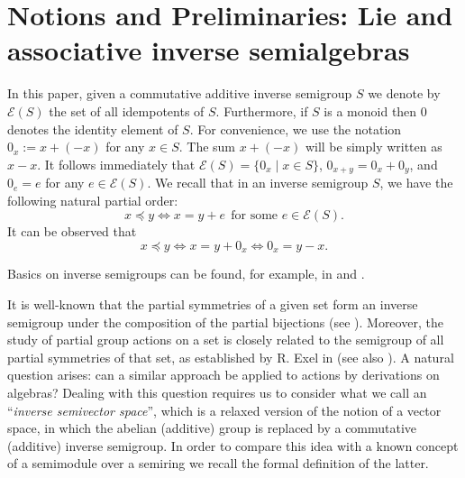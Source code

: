 \documentclass{amsart}
\newcommand{\E}{\mathcal{E}}
\newcommand{\0}{{\vartheta}}
\theoremstyle{definition}
\theoremstyle{remark}
\numberwithin{equation}{section}
\newtheorem*{Theorem A}{\textbf{Theorem A}}
\newtheorem*{Corollary E}{\textbf{Corollary E}}
\newtheorem*{Corollary F}{\textbf{Corollary F}}
\newtheorem*{Theorem B}{\textbf{Theorem B}}
\newtheorem*{Theorem C}{\textbf{Theorem C}}
\newtheorem*{Theorem D}{\textbf{Theorem B}}
\newtheorem*{p a}{\textbf{Proof of  Theorem A}}
\newtheorem*{p b}{\textbf{Proof of Theorem B}}
\newtheorem*{p c}{\textbf{Proof of  Theorem C}}
\newtheorem*{p d}{\textbf{Proof of  Theorem D}}
\begin{document}
\section{Notions and Preliminaries: Lie and associative inverse semialgebras}\label{s: preliminaries}

In this paper, given  a commutative additive inverse semigroup $S$ we denote by $\E(S)$ the set of all idempotents of $S$. Furthermore, if $S$ is a monoid then $0$ denotes the identity element of $S$. For convenience, we use the notation  $0_x:=x +(-x)$ for any $x\in S.$ The sum $
x +(-x)$ will be simply written as $x-x.$ It follows immediately that $\E(S)=\{0_x\mid x\in S\}$, $0_{x+y}=0_x+0_y$, and $0_e=e$ for any $e\in \E(S)$. We recall that in an inverse semigroup $S$, we have the following natural partial order: 
\[x\preceq y \Longleftrightarrow x=y+e~~\text{for some } e\in \E(S). \] It can be observed that 
 \begin{equation}\label{eq_order}
    x\preceq y \Longleftrightarrow x=y+0_{x}\Longleftrightarrow 0_x=y-x.
\end{equation}


Basics on inverse semigroups can be found, for example, in \cite{Lawson} and  \cite{Petrich1984}. 


It is well-known that the  partial symmetries of a given set form an inverse semigroup under the composition of the partial bijections (see \cite{Lawson}). Moreover, the study of partial group actions on a set is closely related to the semigroup of all partial symmetries of that set, as established by R. Exel in 
\cite{Exel1998} (see also \cite{KL}). A natural question arises: can a similar approach be applied to actions by derivations on algebras?  Dealing with this question requires us to consider  what we call an ``{\em inverse semivector space}'', which is a relaxed version of the notion of a vector space, in which the  abelian (additive) group is replaced by a commutative (additive) inverse semigroup. In order to compare this idea with a known concept of a semimodule over a semiring we recall the formal definition of the latter.
\end{document}
